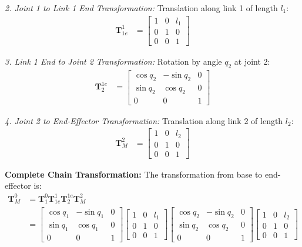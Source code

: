 \documentclass[11pt,a4paper]{article}
\begin{document}
\textit{2. Joint 1 to Link 1 End Transformation:}
Translation along link 1 of length $l_1$:
\begin{align}
\bm{T}_{1e}^1 &= \begin{bmatrix}
1 & 0 & l_1 \\
0 & 1 & 0 \\
0 & 0 & 1
\end{bmatrix}
\end{align}

\textit{3. Link 1 End to Joint 2 Transformation:}
Rotation by angle $q_2$ at joint 2:
\begin{align}
\bm{T}_2^{1e} &= \begin{bmatrix}
\cos q_2 & -\sin q_2 & 0 \\
\sin q_2 & \cos q_2 & 0 \\
0 & 0 & 1
\end{bmatrix}
\end{align}

\textit{4. Joint 2 to End-Effector Transformation:}
Translation along link 2 of length $l_2$:
\begin{align}
\bm{T}_M^2 &= \begin{bmatrix}
1 & 0 & l_2 \\
0 & 1 & 0 \\
0 & 0 & 1
\end{bmatrix}
\end{align}

\textbf{Complete Chain Transformation:}
The transformation from base to end-effector is:
\begin{align}
\bm{T}_M^0 &= \bm{T}_1^0 \bm{T}_{1e}^1 \bm{T}_2^{1e} \bm{T}_M^2 \\
&= \begin{bmatrix}
\cos q_1 & -\sin q_1 & 0 \\
\sin q_1 & \cos q_1 & 0 \\
0 & 0 & 1
\end{bmatrix}
\begin{bmatrix}
1 & 0 & l_1 \\
0 & 1 & 0 \\
0 & 0 & 1
\end{bmatrix}
\begin{bmatrix}
\cos q_2 & -\sin q_2 & 0 \\
\sin q_2 & \cos q_2 & 0 \\
0 & 0 & 1
\end{bmatrix}
\begin{bmatrix}
1 & 0 & l_2 \\
0 & 1 & 0 \\
0 & 0 & 1
\end{bmatrix}
\end{align}
\end{document}
